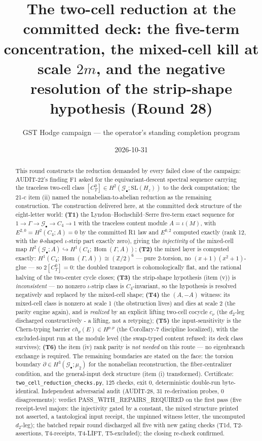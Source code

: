 \documentclass[11pt]{article}
\title{The two-cell reduction at the committed deck: the five-term
concentration, the mixed-cell kill at scale $2m$, and the negative resolution of
the strip-shape hypothesis (Round 28)}
\author{GST Hodge campaign — the operator's standing completion program}
\date{2026-10-31}
\newcommand{\GammaL}{\Gamma}
\newcommand{\Cfour}{C_4}
\newcommand{\Gbul}{\mathcal{G}_\bullet}
\newcommand{\Hom}{\operatorname{Hom}}
\newcommand{\Z}{\mathbb{Z}}
\begin{document}
\maketitle

\begin{abstract}
This round constructs the reduction demanded by every failed close of the
campaign: AUDIT-22's finding F1 asked for the equivariant-descent spectral
sequence carrying the traceless two-cell class
$[C_T^0]\in H^2(\Gbul;\mathrm{SL}(H_z))$ to the deck computation; the
21-c item (ii) named the nonabelian-to-abelian reduction as the
remaining construction. The construction delivered here, at the
committed deck structure of the eight-letter world:
\textbf{(T1)} the Lyndon--Hochschild--Serre five-term exact sequence
for $1\to\GammaL\to\Gbul\to \Cfour\to 1$ with the traceless content
module $A=\iota(M)$, with $E^{2,0}=H^2(\Cfour;A)=0$ by the committed R1
law and $E^{0,2}$ computed exactly (rank 12, with the
$\theta$-shaped $\iota$-strip part exactly zero), giving the
\emph{injectivity} of the mixed-cell map
$H^2(\Gbul;A)\hookrightarrow H^1(\Cfour;\Hom(\GammaL,A))$;
\textbf{(T2)} the mixed layer is computed exactly:
$H^1(\Cfour;\Hom(\GammaL,A))\cong(\Z/2)^6$ — pure 2-torsion, no
$(x{+}1)(x^2{+}1)$-glue — so $2[C_T^0]=0$: the doubled transport is
cohomologically flat, and the rational halving of the two-center cycle
closes; \textbf{(T3)} the strip-shape hypothesis (item (v)) is
\emph{inconsistent} — no nonzero $\iota$-strip class is $\Cfour$-invariant,
so the hypothesis is resolved negatively and replaced by the
mixed-cell shape; \textbf{(T4)} the $(A,-A)$ witness: its mixed-cell
class is nonzero at scale 1 (the obstruction lives) and dies at scale 2
(the parity engine again), and is \emph{realized} by an explicit
lifting two-cell cocycle $c_\nu$ (the $d_2$-leg discharged
constructively - a lifting, not a retyping); \textbf{(T5)} the
input-sensitivity is the Chern-typing barrier $ch_p(E)\in H^{p,p}$ (the
Corollary-7 discipline localized), with the excluded-input run at the
module level (the swap-typed content refused: its deck class
survives); \textbf{(T6)} the item (iv) rank parity is \emph{not needed}
on this route — no eigenbranch exchange is required. The remaining
boundaries are stated on the face: the torsion boundary
$\partial\in H^3(\Gbul;\mu_2)$ for the nonabelian reconstruction, the
fiber-centralizer condition, and the general-input deck structure
(item (i) transformed). Certificate:
\texttt{two\_cell\_reduction\_checks.py}, 125 checks, exit 0,
deterministic double-run byte-identical. Independent adversarial audit
(AUDIT-28, 31 re-derivation probes, 0 disagreements): verdict
PASS\_WITH\_REPAIRS\_REQUIRED on the first pass (five receipt-level
majors: the injectivity gated by a constant, the mixed structure
printed not asserted, a tautological input receipt, the unpinned
witness letter, the uncomputed $d_2$-leg); the batched repair round
discharged all five with new gating checks (T1d, T2-assertions,
T4-receipts, T4-LIFT, T5-excluded); the closing re-check confirmed.
\end{abstract}
\end{document}
